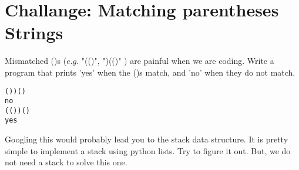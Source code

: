 \documentclass{article}
\begin{document}
\section{Challange: Matching parentheses Strings}
Mismatched ()s ($e.g.$ "(()", ")(()" ) are painful when we are coding. Write a
program that prints 'yes' when the ()s match, and 'no' when they do not match.

\begin{lstlisting}
())()
no
(())()
yes
\end{lstlisting}
Googling this would probably lead you to the stack data structure. It is pretty
simple to implement a stack using python lists. Try to figure it out.
But, we do not need a stack to solve this one.
\end{document}
